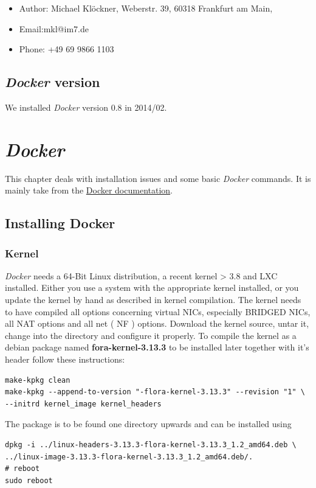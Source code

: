 \documentclass[captions=tableheading]{article}
\begin{document}
\begin{itemize}
\item Author: Michael Klöckner, Weberstr. 39, 60318 Frankfurt am Main,
\item Email:mkl@im7.de
\item Phone: +49 69 9866 1103
\end{itemize}
\subsection{\emph{Docker} version}
\label{sec-1-4}

   We installed \emph{Docker} version 0.8 in 2014/02.
\section{\emph{Docker}}
\label{sec-2}

This chapter deals with installation issues and some basic \emph{Docker} commands. It is mainly take from the \href{http://docs.docer.io/en/latest/}{Docker documentation}. 
\subsection{Installing Docker}
\label{sec-2-1}
\subsubsection{Kernel}
\label{sec-2-1-1}

\emph{Docker} needs a 64-Bit Linux distribution, a recent kernel > 3.8 and LXC
installed. Either you use a system with the appropriate kernel installed, or
you update the kernel by hand as described in kernel compilation. The kernel needs to have compiled all options concerning virtual NICs, especially
BRIDGED NICs, all NAT options and all net  ( NF ) options. Download
the kernel source, untar it, change into the directory and configure it properly. To compile the kernel as a debian package named \textbf{fora-kernel-3.13.3}
to be installed later together with it's header follow these instructions:

\begin{verbatim}
make-kpkg clean
make-kpkg --append-to-version "-flora-kernel-3.13.3" --revision "1" \
--initrd kernel_image kernel_headers
\end{verbatim}
The package is to be found one directory upwards and can be installed using

\begin{verbatim}
dpkg -i ../linux-headers-3.13.3-flora-kernel-3.13.3_1.2_amd64.deb \
../linux-image-3.13.3-flora-kernel-3.13.3_1.2_amd64.deb/.
# reboot
sudo reboot
\end{verbatim}
\end{document}
